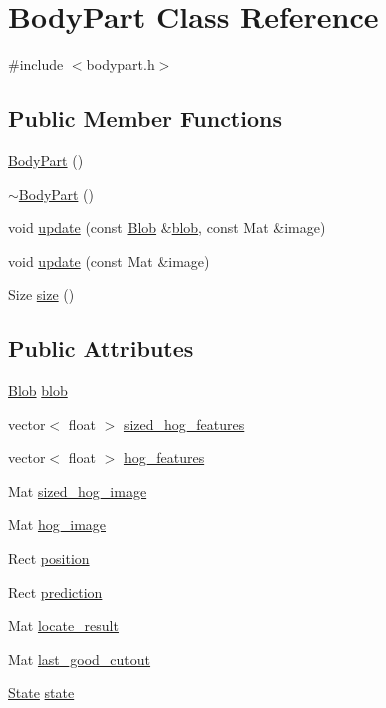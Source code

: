 \hypertarget{class_body_part}{
\section{BodyPart Class Reference}
\label{class_body_part}
}


{\ttfamily \#include $<$bodypart.h$>$}

\subsection*{Public Member Functions}
\begin{DoxyCompactItemize}
\item 
\hyperlink{class_body_part_a9599eb919a1223d5597f85fedd74085a}{BodyPart} ()
\item 
\hyperlink{class_body_part_a0d51eaacbf15745175b21bf44f67a92a}{$\sim$BodyPart} ()
\item 
void \hyperlink{class_body_part_a28774f4b49bb9f45a9d93aecb48ca35c}{update} (const \hyperlink{class_blob}{Blob} \&\hyperlink{class_body_part_a21a062ca3c7c36b43d706c364adaca5d}{blob}, const Mat \&image)
\item 
void \hyperlink{class_body_part_a773194f7743a0ef3caba005bf889db9f}{update} (const Mat \&image)
\item 
Size \hyperlink{class_body_part_a2a68dbe49c4ebe6b92f78c6c666a2790}{size} ()
\end{DoxyCompactItemize}
\subsection*{Public Attributes}
\begin{DoxyCompactItemize}
\item 
\hyperlink{class_blob}{Blob} \hyperlink{class_body_part_a21a062ca3c7c36b43d706c364adaca5d}{blob}
\item 
vector$<$ float $>$ \hyperlink{class_body_part_a3f5a0f7d38d2232a8cfc0249ab155362}{sized\_\-hog\_\-features}
\item 
vector$<$ float $>$ \hyperlink{class_body_part_ade0cc8a87533c1b94de1e2d791524384}{hog\_\-features}
\item 
Mat \hyperlink{class_body_part_a70d555b6aec42d21a33486aa551fbe01}{sized\_\-hog\_\-image}
\item 
Mat \hyperlink{class_body_part_a3c20909c91e11e91f1eb62bda30d4963}{hog\_\-image}
\item 
Rect \hyperlink{class_body_part_a1ebad48b1ef92b8f7386fc88edf7634d}{position}
\item 
Rect \hyperlink{class_body_part_a085e41dccbaf4c5131185f16a6f54e2f}{prediction}
\item 
Mat \hyperlink{class_body_part_a9d7f6ec18ce64885e9bfe324a5084e6b}{locate\_\-result}
\item 
Mat \hyperlink{class_body_part_af4e4c0d4c54b8e744763f5fbfcd429f7}{last\_\-good\_\-cutout}
\item 
\hyperlink{bodypart_8h_a5d74787dedbc4e11c1ab15bf487e61f8}{State} \hyperlink{class_body_part_ad2d71d425b166e90ca6b4ef393c8b9ef}{state}
\end{DoxyCompactItemize}


